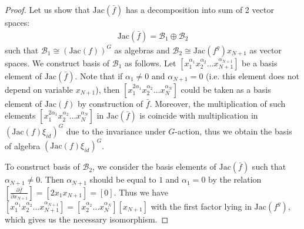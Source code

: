 \documentclass[reqno,12pt]{amsart}
\numberwithin{equation}{section}
\theoremstyle{plain}
\theoremstyle{definition}
\newcommand{\Jac}{\mathrm{Jac}}
\begin{document}
\begin{proof}
 Let us show that $\Jac(\bar{f})$ has a decomposition into sum of 2 vector spaces:
\begin{align*}
    \Jac(\bar{f}) = \mathcal{B}_1\oplus\mathcal{B}_2
\end{align*}
such that $\mathcal{B}_1 \cong (\Jac(f))^G$ as algebras and $\mathcal{B}_2 \cong \Jac(f^g)x_{N+1}$ as vector spaces. 
We construct basis of $\mathcal{B}_1$ as follows. Let $[x_1^{\alpha_1}x_2^{\alpha_2}\dots x_{N+1}^{\alpha_{N+1}}]$ be a basis element of $\Jac(\bar{f})$. Note that if $\alpha_1 \neq 0$ and $\alpha_{N+1} = 0$ (i.e. this element does not depend on variable $x_{N+1}$), then $[x_1^{2\alpha_1}x_2^{\alpha_2}\dots x_{N}^{\alpha_{N}}]$ could be taken as a basis element of $\Jac(f)$ by construction of $\bar{f}$. Moreover, the multiplication of such elements $[x_1^{2\alpha_1}x_2^{\alpha_2}\dots x_{N}^{\alpha_{N}}]$ in $\Jac(\bar{f})$ is coincide with multiplication in $(\Jac(f)\xi_{id})^G$ due to the invariance under $G$-action, thus we obtain the basis of algebra $(\Jac(f)\xi_{id})^G$. 

To construct basis of $\mathcal{B}_2$, we consider the basis elements of $\Jac(\bar{f})$ such that $\alpha_{N+1} \neq 0$. Then $\alpha_{N+1}$ should be  equal to $1$ and $\alpha_1=0$ by the relation $[\frac{\partial \bar{f}}{\partial x_{N+1}}] = [2x_1x_{N+1}] = [0]$. Thus we have $[x_1^{\alpha_1}x_2^{\alpha_2}\dots x_{N+1}^{\alpha_{N+1}}] =[x_2^{\alpha_2}\dots x_{N}^{\alpha_{N}}][x_{N+1}]$ with the first factor lying in $\Jac(f^g)$, which gives us the necessary isomorphism.


\end{proof}
\end{document}

